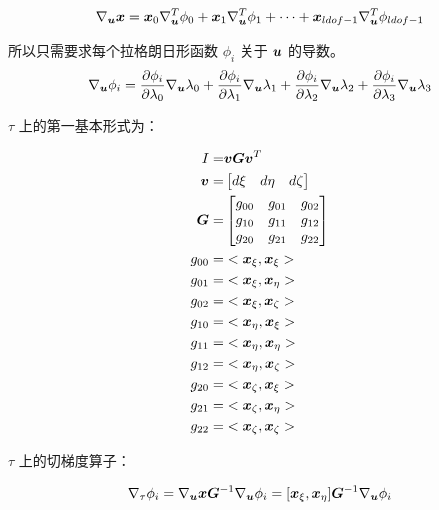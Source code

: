 \documentclass{article}
\begin{document}
\begin{align*}
    \nabla_{{\boldsymbol u}}{\boldsymbol x} = {\boldsymbol x}_0\nabla_{{\boldsymbol u}}^T\phi_0+{\boldsymbol x}_1\nabla_{{\boldsymbol u}}^T\phi_1
     + \cdots+{\boldsymbol x}_{ldof-1}\nabla_{{\boldsymbol u}}^T\phi_{ldof-1}
\end{align*}

所以只需要求每个拉格朗日形函数 $\phi_i$ 关于 ${\boldsymbol u}$ 的导数。
\begin{align*}
    \nabla_{{\boldsymbol u}}\phi_i =
    \frac{\partial\phi_i}{\partial\lambda_0}\nabla_{{\boldsymbol u}}\lambda_0 + 
    \frac{\partial\phi_i}{\partial\lambda_1}\nabla_{{\boldsymbol u}}\lambda_1 +
    \frac{\partial\phi_i}{\partial\lambda_2}\nabla_{{\boldsymbol u}}\lambda_2 +
    \frac{\partial\phi_i}{\partial\lambda_3}\nabla_{{\boldsymbol u}}\lambda_3 
\end{align*}

$\tau$ 上的第一基本形式为：


\begin{align*}
	I = & {\boldsymbol v}{\boldsymbol G}{\boldsymbol v}^T \\
	{\boldsymbol v} = & 
	\begin{bmatrix}
	d\xi & d\eta & d\zeta
	\end{bmatrix}	\\
    {\boldsymbol G} = & 
    \begin{bmatrix}
        g_{00} & g_{01} & g_{02} \\
        g_{10} & g_{11} & g_{12} \\
        g_{20} & g_{21} & g_{22}
    \end{bmatrix}\\
    g_{00} = & <{\boldsymbol x}_\xi, {\boldsymbol x}_\xi> \\
    g_{01} = & <{\boldsymbol x}_\xi, {\boldsymbol x}_\eta> \\
    g_{02} = & <{\boldsymbol x}_\xi, {\boldsymbol x}_\zeta> \\
    g_{10} = & <{\boldsymbol x}_\eta,{\boldsymbol x}_\xi> \\
    g_{11} = & <{\boldsymbol x}_\eta,{\boldsymbol x}_\eta> \\
    g_{12} = & <{\boldsymbol x}_\eta,{\boldsymbol x}_\zeta> \\
    g_{20} = & <{\boldsymbol x}_\zeta,{\boldsymbol x}_\xi> \\
    g_{21} = & <{\boldsymbol x}_\zeta,{\boldsymbol x}_\eta> \\
    g_{22} = & <{\boldsymbol x}_\zeta,{\boldsymbol x}_\zeta>
\end{align*}

$\tau$ 上的切梯度算子：

\begin{align*}
    \nabla_\tau \phi_i = 
    \nabla_{\boldsymbol u} {\boldsymbol x} {\boldsymbol G}^{-1} \nabla_{\boldsymbol u} \phi_i =
    [{\boldsymbol x}_\xi, {\boldsymbol x}_\eta] {\boldsymbol G}^{-1} \nabla_{\boldsymbol u} \phi_i
\end{align*}
\end{document}
